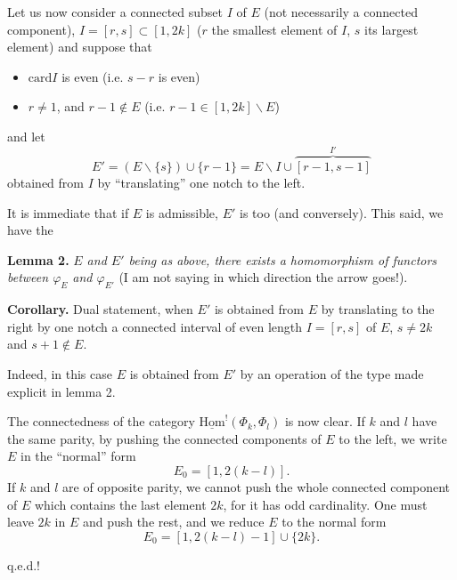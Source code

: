 \documentclass[11pt]{article}
\newcommand{\msp}[1]{\marginpar{\footnotesize [#1]}}
\newcommand{\card}{\mathrm{card}}
\newcommand{\uHom}{\underline{\mathrm{Hom}}}
\begin{document}
Let us now consider a connected subset $I$ of $E$ (not necessarily a connected component), $I=[r,s]\subset[1,2k]$ ($r$ the smallest element of $I$, $s$ its largest element) and suppose that

\begin{itemize}
\item[a)] $\card I$ is even (i.e. $s-r$ is even)
\item[b)] $r\neq1$, and $r-1\notin E$ (i.e. $r-1\in[1,2k]\backslash E$)
\end{itemize}

and let
\[
E'=(E\backslash\{s\})\cup\{r-1\}=E\backslash I\cup\overbrace{[r-1,s-1]}^{I'}
\]
obtained from $I$ by ``translating'' one notch to the left.

\msp{page 21}
It is immediate that if $E$ is admissible, $E'$ is too (and conversely). This said, we have the

\textbf{Lemma 2.} \textit{$E$ and $E'$ being as above, there exists a homomorphism of functors between $\varphi_E$ and $\varphi_{E'}$} (I am not saying in which direction the arrow goes!). %

\textbf{Corollary.} Dual statement, when $E'$ is obtained from $E$ by translating to the right by one notch a connected interval of even length $I=[r,s]$ of $E$, $s\neq2k$ and $s+1\notin E$.

Indeed, in this case $E$ is obtained from $E'$ by an operation of the type made explicit in lemma 2.

The connectedness of the category $\uHom^{!}(\Phi_k,\Phi_l)$ is now clear. If $k$ and $l$ have the same parity, by pushing the connected components of $E$ to the left, we write $E$ in the ``normal'' form
\[
E_0=[1,2(k-l)].
\]
If $k$ and $l$ are of opposite parity, we cannot push the whole connected component of $E$ which contains the last element $2k$, for it has odd cardinality. One must leave $2k$ in $E$ and push the rest, and we reduce $E$ to the normal form
\[
E_0=[1,2(k-l)-1]\cup\{2k\}.
\]

\hfill q.e.d.!
\end{document}

